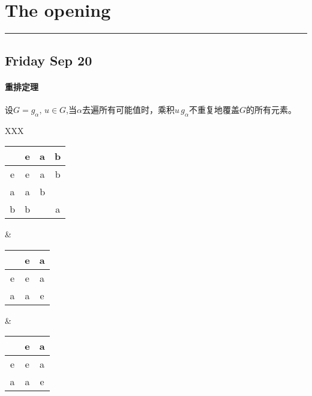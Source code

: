 \setcounter{section}{2}
\section{The opening}
\vspace{-15pt}\noindent\rule{\textwidth}{0.1pt}\vspace{-10pt}
    \subsection{\hfill \small Friday Sep 20}
    \paragraph{重排定理} 设$G={g_\alpha},\,u\in G$,当$\alpha$去遍所有可能值时，乘积$u\,g_\alpha$不重复地覆盖$G$的所有元素。

    \begin{center}\begin{tabularx}{\linewidth}{XXX}
        \begin{tabular}{c|c c c}
            ~ & e & a & b \\ \hline
            e & e & a & b \\
            a & a & b & ~ \\
            b & b & ~ & a \\
        \end{tabular} &
        \begin{tabular}{c|c c}
            ~ & e & a \\ \hline
            e & e & a \\
            a & a & e \\
        \end{tabular} &
        \begin{tabular}{c|c c}
            ~ & e & a \\ \hline
            e & e & a \\
            a & a & e \\
        \end{tabular}
    \end{tabularx}\end{center}